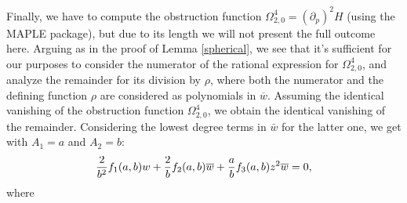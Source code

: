 \documentclass[12pt]{amsart}
\begin{document}
Finally, we have to compute the obstruction function $\Omega^4_{2,0}=(\partial_p)^2H$ (using the MAPLE package), but due to its length we will not present the full outcome here. Arguing as in the proof of Lemma \ref{spherical}, we see that it's sufficient for our purposes to consider the numerator of the rational expression for $\Omega^4_{2,0}$, and analyze the remainder for its division by $\rho$, where both the numerator and the defining function $\rho$ are considered as polynomials in $\overline{w}$. Assuming the identical vanishing of the obstruction function $\Omega^4_{2,0}$, we obtain the identical vanishing of the remainder. Considering the lowest degree terms in $\bar w$ for the latter one, we get with $A_1=a$ and $A_2=b$:
\begin{eqnarray}\label{latter}
{2\over b^2} f_1(a,b) w+{2\over b} f_2(a,b) \overline{w} +{a\over b}  f_3(a,b)z^2\overline{w}=0,
\end{eqnarray}
where
\end{document}

